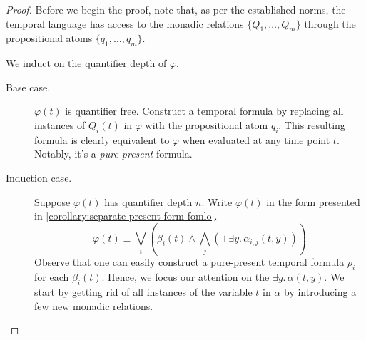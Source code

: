 \documentclass[a4paper,UKenglish,cleveref, autoref, thm-restate, numberwithinsect]{lipics-v2021}
\begin{document}
\begin{proof}
    Before we begin the proof, note that, as per the established norms, the temporal language has access to the monadic relations $\{Q_1, \ldots, Q_m\}$ through the propositional atoms $\{q_1, \ldots, q_m\}$.

    We induct on the quantifier depth of $\varphi$.
    \begin{description}
        \item[Base case.] $\varphi(t)$ is quantifier free. Construct a temporal formula by replacing all instances of $Q_i(t)$ in $\varphi$ with the propositional atom $q_i$. This resulting formula is clearly equivalent to $\varphi$ when evaluated at any time point $t$. Notably, it's a \textit{pure-present} formula.
        \item[Induction case.] Suppose $\varphi(t)$ has quantifier depth $n$. Write $\varphi(t)$ in the form presented in \cref{corollary:separate-present-form-fomlo}.
        \begin{equation}
            \label{eq:present-separate-form-fomlo}
            \varphi(t) \equiv \bigvee_i \left( \beta_i(t) \land \bigwedge_j \left( \pm \exists y.\, \alpha_{i, j}\left(t, y\right) \right) \right)
        \end{equation}
        Observe that one can easily construct a pure-present temporal formula $\rho_i$ for each $\beta_i(t)$. Hence, we focus our attention on the $\exists y.\, \alpha(t, y)$. We start by getting rid of all instances of the variable $t$ in $\alpha$ by introducing a few new monadic relations.


\end{description}
\end{proof}
\end{document}
